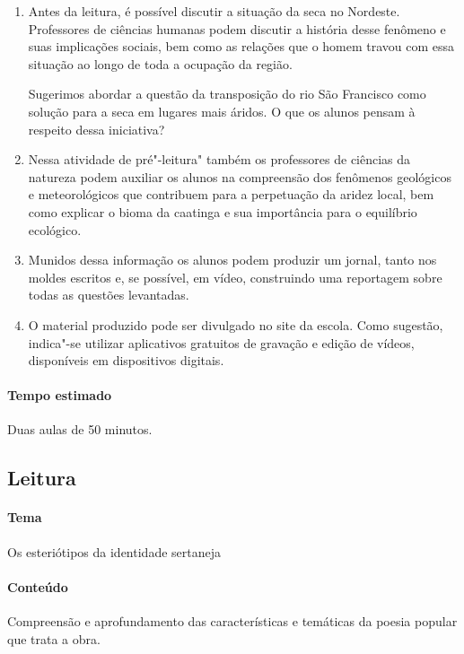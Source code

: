 \documentclass[12pt]{extarticle}
\begin{document}
\begin{enumerate}
\item
Antes da leitura, é possível discutir a situação da seca no
Nordeste. Professores de ciências humanas podem discutir a história
desse fenômeno e suas implicações sociais, bem como as relações que o
homem travou com essa situação ao longo de toda a ocupação da região.

Sugerimos abordar a questão da transposição do rio São Francisco como 
solução para a seca em lugares mais áridos. O que os alunos pensam à respeito 
dessa iniciativa? 

\item
Nessa atividade de pré"-leitura" também os professores de ciências da natureza 
podem auxiliar os alunos na compreensão dos fenômenos geológicos e meteorológicos que
contribuem para a perpetuação da aridez local, bem como explicar o bioma
da caatinga e sua importância para o equilíbrio ecológico. 

\item
Munidos dessa informação os alunos podem produzir um jornal, tanto nos moldes
escritos e, se possível, em vídeo, construindo uma reportagem sobre todas as
questões levantadas. 

\item
O material produzido pode ser divulgado no site da
escola. Como sugestão, indica"-se utilizar aplicativos gratuitos de
gravação e edição de vídeos, disponíveis em dispositivos digitais.

\end{enumerate}

\paragraph{Tempo estimado} Duas aulas de 50 minutos. 


\subsection{Leitura}

\paragraph{Tema} Os esteriótipos da identidade sertaneja 

\paragraph{Conteúdo} Compreensão e aprofundamento das características e temáticas da poesia popular
que trata a obra.
\end{document}
